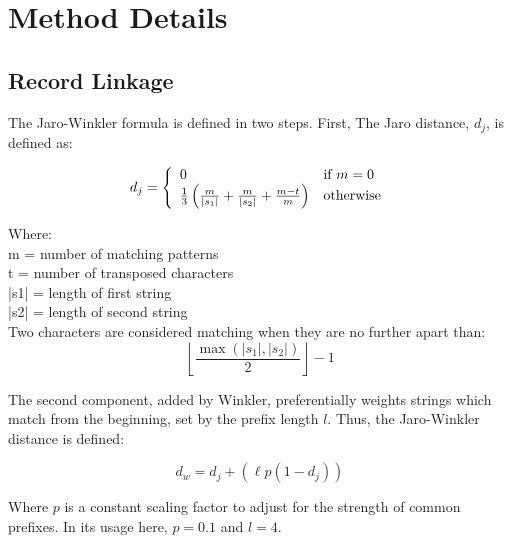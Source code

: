 \chapter{Method Details}

\section{Record Linkage}
\label{sec:record-linkage-appendix}

The Jaro-Winkler formula is defined in two steps. First, The Jaro distance, $d_j $, is defined as:


\begin{equation}
  d_j = \left\{
  \begin{array}{l l}
    0 & \text{if }m = 0 \\ 
    \frac{1}{3}\left(\frac{m}{|s_1|} + \frac{m}{|s_2|} + \frac{m-t}{m}\right) & \text{otherwise} \end{array} \right.
\end{equation}

Where:\\
m = number of matching patterns \\
t = number of transposed characters \\
|s1| = length of first string \\
|s2| = length of second string \\

Two characters are considered matching when they are no further apart than:
\begin{equation}
  \left\lfloor\frac{\max(|s_1|,|s_2|)}{2}\right\rfloor-1
\end{equation}

The second component, added by Winkler, preferentially weights strings which match from the beginning, set by the prefix length $ l $.  Thus, the Jaro-Winkler distance is defined:

\begin{equation}
  d_w = d_j + (\ell p (1 - d_j))
\end{equation}

Where $ p $ is a constant scaling factor to adjust for the strength of common prefixes. In its usage here, $ p = 0.1 $ and $ l = 4 $.


